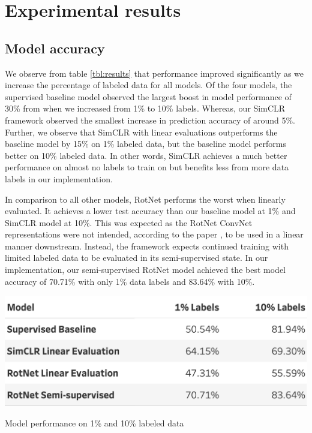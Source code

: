 \section{Experimental results}
\label{exper}

\subsection{Model accuracy}

We observe from table \ref{tbl:results} that performance improved significantly as we increase the percentage of labeled data for all models. Of the four models, the supervised baseline model observed the largest boost in model performance of 30\% from when we increased from 1\% to 10\% labels. Whereas, our SimCLR framework observed the smallest increase in prediction accuracy of around 5\%. Further, we observe that SimCLR with linear evaluations outperforms the baseline model by 15\% on 1\% labeled data, but the baseline model performs better on 10\% labeled data. 
In other words, SimCLR achieves a much better performance on almost no labels to train on but benefits less from more data labels in our implementation.

In comparison to all other models, RotNet performs the worst when linearly evaluated. It achieves a lower test accuracy than our baseline model at 1\% and SimCLR model at 10\%. This was expected as the RotNet ConvNet representations were not intended, according to the paper \cite{RotNet}, to be used in a linear manner downstream. Instead, the framework expects continued training with limited labeled data to be evaluated in its semi-supervised state. In our implementation, our semi-supervised RotNet model achieved the best model accuracy of 70.71\% with only 1\% data labels and 83.64\% with 10\%.


\begin{table}[!htbp]
    \centering
    \includegraphics[width=.60\linewidth]{figs/results}
    \vspace{0.2cm}
    \caption{Model performance on 1\% and 10\% labeled data}
    \label{tbl:results}
\end{table}

